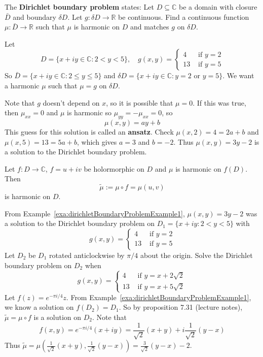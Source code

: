 \begin{definition}
	The \textbf{Dirichlet boundary problem} states: Let $D \subseteq \mathbb{C}$ be a domain with closure $\bar{D}$ and boundary $\delta D$. Let $g: \delta D \rightarrow \mathbb{R}$ be continuous. Find a continuous function $\mu: \bar{D} \rightarrow \mathbb{R}$ such that $\mu$ is harmonic on $D$ and matches $g$ on $\delta D$.
\end{definition}

\begin{example}\label{exa:dirichletBoundaryProblemExample1}
	Let
	\[
		D = \{ x + iy \in \mathbb{C}: 2 < y < 5 \}, \quad g(x, y) = \begin{cases}
			4 & \text{ if } y = 2 \\
			13 & \text{ if } y = 5
		\end{cases}
	\]
	So $\bar{D} = \{ x + iy \in \mathbb{C}: 2 \le y \le 5 \}$ and $\delta D = \{ x + iy \in \mathbb{C}: y = 2 \text{ or } y = 5 \}$. We want a harmonic $\mu$ such that $\mu = g$ on $\delta D$.

	Note that $g$ doesn't depend on $x$, so it is possible that $\mu = 0$. If this was true, then $\mu_{xx} = 0$ and $\mu$ is harmonic so $\mu_{yy} = -\mu_{xx} = 0$, so
	\[
		\mu(x, y) = ay + b
	\]
	This guess for this solution is called an \textbf{ansatz}. Check $\mu(x, 2) = 4 = 2a + b$ and $\mu(x, 5) = 13 = 5a + b$, which gives $a = 3$ and $b = -2$. Thus $\mu(x, y) = 3y - 2$ is a solution to the Dirichlet boundary problem.
\end{example}

\begin{proposition}
	Let $f: D \rightarrow \mathbb{C}$, $f = u + iv$ be holormorphic on $D$ and $\mu$ is harmonic on $f(D)$. Then
	\[
		\tilde{\mu} := \mu \circ f = \mu(u, v)
	\]
	is harmonic on $D$.
\end{proposition}

\begin{example}
	From Example~\ref{exa:dirichletBoundaryProblemExample1}, $\mu(x, y) = 3y - 2$ was a solution to the Dirichlet boundary problem on $D_1 = \{ x + iy: 2 < y < 5 \}$ with
	\[
		g(x, y) = \begin{cases}
			4 & \text{ if } y = 2 \\
			13 & \text{ if } y = 5
		\end{cases}
	\]
	Let $D_2$ be $D_1$ rotated anticlockwise by $\pi/4$ about the origin. Solve the Dirichlet boundary problem on $D_2$ when
	\[
		g(x, y) = \begin{cases}
			4 & \text{ if } y = x + 2 \sqrt{2} \\
			13 & \text{ if } y = x + 5 \sqrt{2}
		\end{cases}
	\]
	Let $f(z) = e^{-\pi i / 4} z$. From Example~\ref{exa:dirichletBoundaryProblemExample1}, we know a solution on $f(D_2) = D_1$. So by proposition 7.31 (lecture notes), $\tilde{\mu} = \mu \circ f$ is a solution on $D_2$. Note that
	\[
		f(x, y) = e^{-\pi i / 4} (x + i y) = \frac{1}{\sqrt{2}} (x + y) + i \frac{1}{\sqrt{2}} (y - x)
	\]
	Thus $\tilde{\mu} = \mu(\frac{1}{\sqrt{2}} (x + y), \frac{1}{\sqrt{2}} (y - x)) = \frac{3}{\sqrt{2}} (y - x) - 2$.
\end{example}

